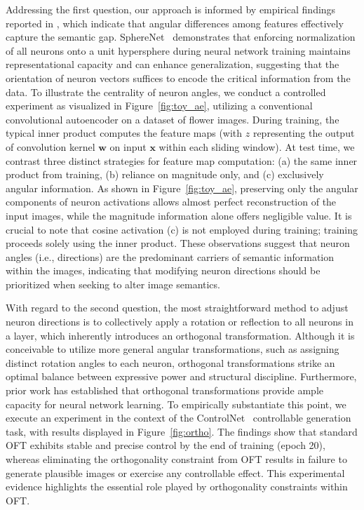 Addressing the first question, our approach is informed by empirical findings reported in \cite{liu2018decoupled,chen2020angular}, which indicate that angular differences among features effectively capture the semantic gap. SphereNet~\cite{liu2017deep} demonstrates that enforcing normalization of all neurons onto a unit hypersphere during neural network training maintains representational capacity and can enhance generalization, suggesting that the orientation of neuron vectors suffices to encode the critical information from the data. To illustrate the centrality of neuron angles, we conduct a controlled experiment as visualized in Figure~\ref{fig:toy_ae}, utilizing a conventional convolutional autoencoder on a dataset of flower images. During training, the typical inner product computes the feature maps (with $z$ representing the output of convolution kernel $\bm{w}$ on input $\bm{x}$ within each sliding window). At test time, we contrast three distinct strategies for feature map computation: (a) the same inner product from training, (b) reliance on magnitude only, and (c) exclusively angular information. As shown in Figure~\ref{fig:toy_ae}, preserving only the angular components of neuron activations allows almost perfect reconstruction of the input images, while the magnitude information alone offers negligible value. It is crucial to note that cosine activation (c) is not employed during training; training proceeds solely using the inner product. These observations suggest that neuron angles (i.e., directions) are the predominant carriers of semantic information within the images, indicating that modifying neuron directions should be prioritized when seeking to alter image semantics.

With regard to the second question, the most straightforward method to adjust neuron directions is to collectively apply a rotation or reflection to all neurons in a layer, which inherently introduces an orthogonal transformation. Although it is conceivable to utilize more general angular transformations, such as assigning distinct rotation angles to each neuron, orthogonal transformations strike an optimal balance between expressive power and structural discipline. Furthermore, prior work \cite{liu2021orthogonal} has established that orthogonal transformations provide ample capacity for neural network learning. To empirically substantiate this point, we execute an experiment in the context of the ControlNet~\cite{zhang2023adding} controllable generation task, with results displayed in Figure~\ref{fig:ortho}. The findings show that standard OFT exhibits stable and precise control by the end of training (epoch 20), whereas eliminating the orthogonality constraint from OFT results in failure to generate plausible images or exercise any controllable effect. This experimental evidence highlights the essential role played by orthogonality constraints within OFT.

